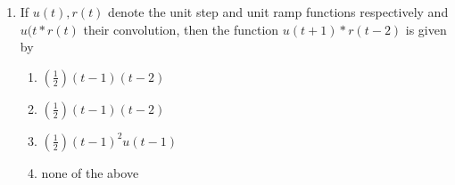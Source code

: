 \documentclass[journal,12pt,onecolumn]{IEEEtran}
\theoremstyle{remark}
\begin{document}
\begin{enumerate}
\item If $u(t),r(t)$ denote the unit step and unit ramp functions respectively and $u(t*r(t)$ their convolution, then the function $u(t+1)*r(t-2)$ is given by
\begin{enumerate}
    \item $(\frac{1}{2})(t-1)(t-2)$
    \item $(\frac{1}{2})(t-1)(t-2)$
    \item $(\frac{1}{2})(t-1)^2u(t-1)$
    \item none of the above
\end{enumerate}

\end{enumerate}
\end{document}
